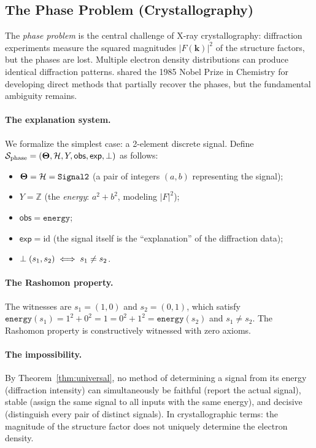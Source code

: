 \subsection{The Phase Problem (Crystallography)}
\label{sec:instance-phase-problem}

The \emph{phase problem} is the central challenge of X-ray crystallography:
diffraction experiments measure the squared magnitudes $|F(\mathbf{k})|^2$ of
the structure factors, but the phases are lost.  Multiple electron density
distributions can produce identical diffraction patterns.
\citet{hauptman1985} shared the 1985 Nobel Prize in Chemistry for developing
direct methods that partially recover the phases, but the fundamental
ambiguity remains.

\paragraph{The explanation system.}
We formalize the simplest case: a 2-element discrete signal.
Define $\mathcal{S}_{\mathrm{phase}} = (\mathbf{\Theta}, \mathcal{H}, Y, \mathsf{obs},
\mathsf{exp}, \perp)$ as follows:
\begin{itemize}
  \item $\mathbf{\Theta} = \mathcal{H} = \texttt{Signal2}$ (a pair of integers $(a, b)$
    representing the signal);
  \item $Y = \mathbb{Z}$ (the \emph{energy}: $a^2 + b^2$, modeling $|F|^2$);
  \item $\mathsf{obs} = \texttt{energy}$;
  \item $\mathsf{exp} = \mathrm{id}$ (the signal itself is the ``explanation''
    of the diffraction data);
  \item $\perp(s_1, s_2) \iff s_1 \ne s_2$.
\end{itemize}

\paragraph{The Rashomon property.}
The witnesses are $s_1 = (1, 0)$ and $s_2 = (0, 1)$, which satisfy
$\texttt{energy}(s_1) = 1^2 + 0^2 = 1 = 0^2 + 1^2 = \texttt{energy}(s_2)$
and $s_1 \ne s_2$.  The Rashomon property is constructively witnessed with
zero axioms.

\paragraph{The impossibility.}
By Theorem~\ref{thm:universal}, no method of determining a signal from its
energy (diffraction intensity) can simultaneously be faithful (report the
actual signal), stable (assign the same signal to all inputs with the same
energy), and decisive (distinguish every pair of distinct signals).
In crystallographic terms: the magnitude of the structure factor does not
uniquely determine the electron density.

